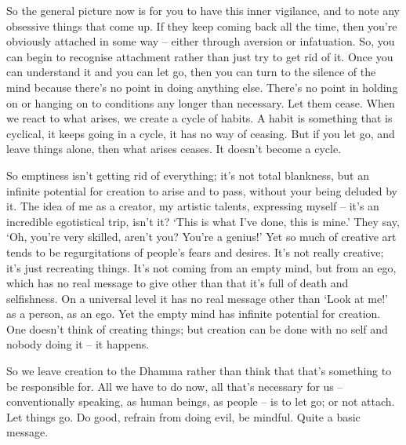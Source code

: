So the general picture now is for you to have this inner vigilance, and to note any obsessive things that come up. If they keep coming back all the time, then you're obviously attached in some way -- either through aversion or infatuation. So, you can begin to recognise attachment rather than just try to get rid of it. Once you can understand it and you can let go, then you can turn to the silence of the mind because there's no point in doing anything else. There's no point in holding on or hanging on to conditions any longer than necessary. Let them cease. When we react to what arises, we create a cycle of habits. A habit is something that is cyclical, it keeps going in a cycle, it has no way of ceasing. But if you let go, and leave things alone, then what arises ceases. It doesn't become a cycle.

So emptiness isn't getting rid of everything; it's not total blankness, but an infinite potential for creation to arise and to pass, without your being deluded by it. The idea of me as a creator, my artistic talents, expressing myself -- it's an incredible egotistical trip, isn't it? `This is what I've done, this is mine.' They say, `Oh, you're very skilled, aren't you? You're a genius!' Yet so much of creative art tends to be regurgitations of people's fears and desires. It's not really creative; it's just recreating things. It's not coming from an empty mind, but from an ego, which has no real message to give other than that it's full of death and selfishness. On a universal level it has no real message other than `Look at me!' as a person, as an ego. Yet the empty mind has infinite potential for creation. One doesn't think of creating things; but creation can be done with no self and nobody doing it -- it happens. 

So we leave creation to the Dhamma rather than think that that's something to be responsible for. All we have to do now, all that's necessary for us -- conventionally speaking, as human beings, as people -- is to let go; or not attach. Let things go. Do good, refrain from doing evil, be mindful. Quite a basic message.



